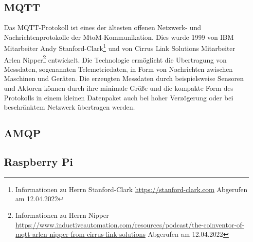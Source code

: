     \subsection{MQTT}
    \label{subsec:mqtt}
        Das \ac{MQTT}-Protokoll ist eines der ältesten offenen Netzwerk- und Nachrichtenprotokolle der 
        \ac{MtoM}-Kommunikation. 
        Dies wurde 1999 von IBM Mitarbeiter Andy Stanford-Clark\footnote{Informationen zu Herrn Stanford-Clark \url{https://stanford-clark.com} Abgerufen am 12.04.2022} 
        und von Cirrus Link Solutions Mitarbeiter Arlen Nipper\footnote{Informationen zu Herrn Nipper \url{https://www.inductiveautomation.com/resources/podcast/the-coinventor-of-mqtt-arlen-nipper-from-cirrus-link-solutions} Abgerufen am 12.04.2022} 
        entwickelt. Die Technologie ermöglicht die Übertragung von Messdaten, sogenannten Telemetriedaten, in Form von 
        Nachrichten zwischen Maschinen und Geräten. Die erzeugten Messdaten durch beispielsweise Sensoren und Aktoren 
        können durch ihre minimale Größe und die kompakte Form des Protokolls in einem kleinen Datenpaket auch bei 
        hoher Verzögerung oder bei beschränktem Netzwerk übertragen werden. 



    \subsection{AMQP}
    \label{subsec:amqp}

    
    \subsection{Raspberry Pi}
    \label{subsec:raspberrypi} 
